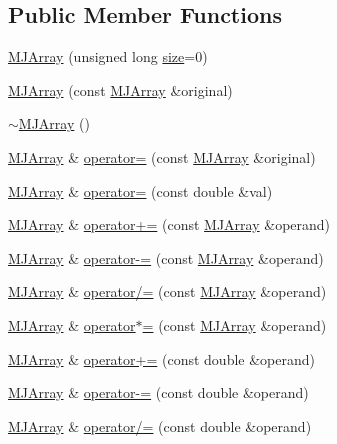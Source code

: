 \subsection*{Public Member Functions}
\begin{DoxyCompactItemize}
\item 
\hyperlink{classMJArray_a422fa68b394b9528cca2e8fbaefb10e9}{M\+J\+Array} (unsigned long \hyperlink{classMJArray_a997898f10d39bc94bd242c308a85bb72}{size}=0)
\item 
\hyperlink{classMJArray_abc20a4af4285b9cc1b53ef1c9455f7b4}{M\+J\+Array} (const \hyperlink{classMJArray}{M\+J\+Array} \&original)
\item 
\hyperlink{classMJArray_a7e3ed3537c34e7643a920069862bc4fa}{$\sim$\+M\+J\+Array} ()
\item 
\hyperlink{classMJArray}{M\+J\+Array} \& \hyperlink{classMJArray_aa9e039dcbf214e52e99a06d31ae7d240}{operator=} (const \hyperlink{classMJArray}{M\+J\+Array} \&original)
\item 
\hyperlink{classMJArray}{M\+J\+Array} \& \hyperlink{classMJArray_a5c7b21d9d8d045c886de8e5a18d34c98}{operator=} (const double \&val)
\item 
\hyperlink{classMJArray}{M\+J\+Array} \& \hyperlink{classMJArray_a90d77478cd3c6a90d8abb4dbbaff7f34}{operator+=} (const \hyperlink{classMJArray}{M\+J\+Array} \&operand)
\item 
\hyperlink{classMJArray}{M\+J\+Array} \& \hyperlink{classMJArray_ab776bc1d3b6d080f74e9d38c0a8e274e}{operator-\/=} (const \hyperlink{classMJArray}{M\+J\+Array} \&operand)
\item 
\hyperlink{classMJArray}{M\+J\+Array} \& \hyperlink{classMJArray_ae376c7745492b26cd040412fd4599a2e}{operator/=} (const \hyperlink{classMJArray}{M\+J\+Array} \&operand)
\item 
\hyperlink{classMJArray}{M\+J\+Array} \& \hyperlink{classMJArray_a00f266e67cd2e280235a3733bc86efaa}{operator$\ast$=} (const \hyperlink{classMJArray}{M\+J\+Array} \&operand)
\item 
\hyperlink{classMJArray}{M\+J\+Array} \& \hyperlink{classMJArray_a63ea203f87c5e0c4ec6e63089d3c4374}{operator+=} (const double \&operand)
\item 
\hyperlink{classMJArray}{M\+J\+Array} \& \hyperlink{classMJArray_afd06295917fc094dea817bf83222d3d1}{operator-\/=} (const double \&operand)
\item 
\hyperlink{classMJArray}{M\+J\+Array} \& \hyperlink{classMJArray_a376204e0aa5fc772aa881598e77020fc}{operator/=} (const double \&operand)
\item 

\end{DoxyCompactItemize}
